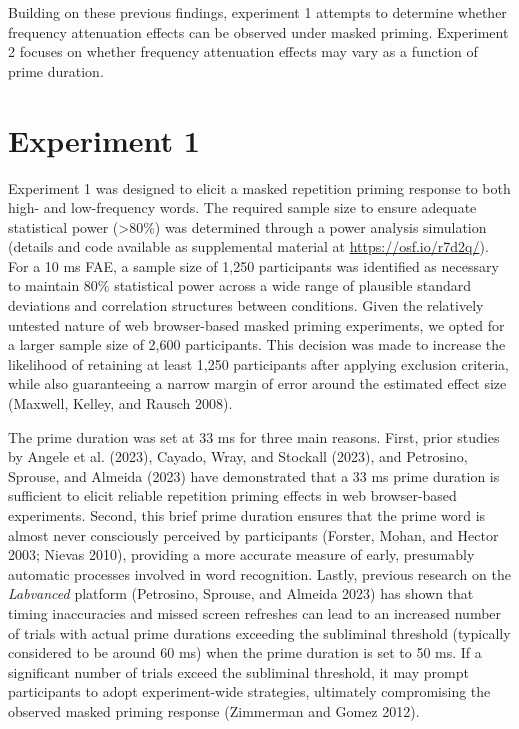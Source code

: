\documentclass[
]{interact}
\begin{document}
Building on these previous findings, experiment 1 attempts to determine
whether frequency attenuation effects can be observed under masked
priming. Experiment 2 focuses on whether frequency attenuation effects
may vary as a function of prime duration.

\section{Experiment 1}\label{sec-exp1}

Experiment 1 was designed to elicit a masked repetition priming response
to both high- and low-frequency words. The required sample size to
ensure adequate statistical power (\textgreater80\%) was determined
through a power analysis simulation (details and code available as
supplemental material at \url{https://osf.io/r7d2q/}). For a 10 ms FAE,
a sample size of 1,250 participants was identified as necessary to
maintain 80\% statistical power across a wide range of plausible
standard deviations and correlation structures between conditions. Given
the relatively untested nature of web browser-based masked priming
experiments, we opted for a larger sample size of 2,600 participants.
This decision was made to increase the likelihood of retaining at least
1,250 participants after applying exclusion criteria, while also
guaranteeing a narrow margin of error around the estimated effect size
(Maxwell, Kelley, and Rausch 2008).

The prime duration was set at 33 ms for three main reasons. First, prior
studies by Angele et al. (2023), Cayado, Wray, and Stockall (2023), and
Petrosino, Sprouse, and Almeida (2023) have demonstrated that a 33 ms
prime duration is sufficient to elicit reliable repetition priming
effects in web browser-based experiments. Second, this brief prime
duration ensures that the prime word is almost never consciously
perceived by participants (Forster, Mohan, and Hector 2003; Nievas
2010), providing a more accurate measure of early, presumably automatic
processes involved in word recognition. Lastly, previous research on the
\emph{Labvanced} platform (Petrosino, Sprouse, and Almeida 2023) has
shown that timing inaccuracies and missed screen refreshes can lead to
an increased number of trials with actual prime durations exceeding the
subliminal threshold (typically considered to be around 60 ms) when the
prime duration is set to 50 ms. If a significant number of trials exceed
the subliminal threshold, it may prompt participants to adopt
experiment-wide strategies, ultimately compromising the observed masked
priming response (Zimmerman and Gomez 2012).
\end{document}
